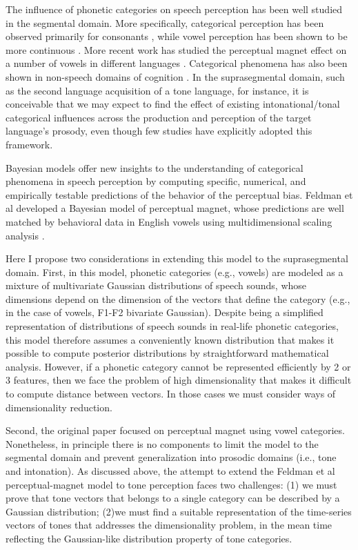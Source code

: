 \documentclass{article}
\begin{document}
The influence of phonetic categories on speech perception has been well studied in the segmental domain. More specifically, categorical perception has been observed primarily for consonants \cite{liberman:57}, while vowel perception has been shown to be more continuous \cite{fry:62}. More recent work has studied the perceptual magnet effect on a number of vowels in different languages \cite{kuhl-et-al:92,iverson:95,diesch:99}. Categorical phenomena has also been shown in non-speech domains of cognition \cite{davidoff:99}. In the suprasegmental domain, such as the second language acquisition of a tone language, for instance, it is conceivable that we may expect to find the effect of existing intonational/tonal categorical influences across the production and perception of the target language's prosody, even though few studies have explicitly adopted this framework\cite{gauthier:07}. 

Bayesian models offer new insights to the understanding of categorical phenomena in speech perception by computing specific, numerical, and empirically testable predictions of the behavior of the perceptual bias. Feldman et al \cite{feldman:09,feldman:13}  developed a Bayesian model of perceptual magnet, whose predictions are well matched by behavioral data in English vowels using multidimensional scaling analysis \cite{iverson:95}. 

Here I propose two considerations in extending this model to the suprasegmental domain. First, in this model, phonetic categories (e.g., vowels) are modeled as a mixture of multivariate Gaussian distributions of speech sounds, whose dimensions depend on the dimension of the vectors that define the category (e.g., in the case of vowels, F1-F2 bivariate Gaussian). Despite being a simplified representation of distributions of speech sounds in real-life phonetic categories, this model therefore assumes a conveniently known distribution that makes it possible to compute posterior distributions by straightforward mathematical analysis. However, if a phonetic category cannot be represented efficiently by 2 or 3 features, then we face the problem of high dimensionality that makes it difficult to compute distance between vectors. In those cases we must consider ways of dimensionality reduction.

Second, the original paper focused on perceptual magnet using vowel categories. Nonetheless, in principle there is no components to limit the model to the segmental domain and prevent generalization into prosodic domains (i.e., tone and intonation). As discussed above, the attempt to extend the Feldman et al\cite{feldman:09} perceptual-magnet model to tone perception faces two challenges: (1) we must prove that tone vectors that belongs to a single category can be described by a Gaussian distribution; (2)we must find a suitable representation of the time-series vectors of tones that addresses the dimensionality problem, in the mean time reflecting the Gaussian-like distribution property of tone categories.
\end{document}
